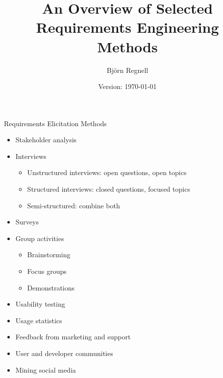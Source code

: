 \documentclass{simpleslides}
\author{Björn Regnell \\ \vspace{1em}{\small \url{https://cs.lth.se/bjorn-regnell}}}
\title{An Overview of Selected\\Requirements Engineering Methods}
\date{\footnotesize Version: \today}
\begin{document}
\maketitle

\begin{frame}[fragile]{Requirements Elicitation Methods}
\begin{itemize}
\item Stakeholder analysis
\item Interviews
\begin{itemize}
  \item Unstructured interviews: open questions, open topics
  \item Structured interviews: closed questions, focused topics
  \item Semi-structured: combine both
\end{itemize}
\item Surveys
\item Group activities
\begin{itemize}
  \item Brainstorming
  \item Focus groups
  \item Demonstrations
\end{itemize}
\item Usability testing
\item Usage statistics
\item Feedback from marketing and support
\item User and developer communities
\item Mining social media
\end{itemize}
\end{frame}
  
\end{document}
